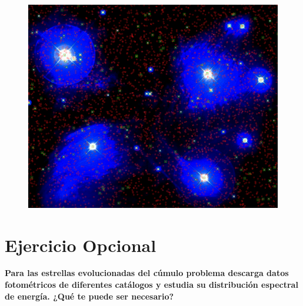 \documentclass[a4paper,fleqn,usenatbib]{mnras}
\begin{document}
\begin{figure}
  \includegraphics[width=\linewidth]{img/m45_cumulo_def}
\end{figure}

\section{Ejercicio Opcional}

\textbf{Para las estrellas evolucionadas del cúmulo problema descarga datos fotométricos de diferentes catálogos y
estudia su distribución espectral de energía. ¿Qué te puede ser necesario?}













\bsp	%
\label{lastpage}
\end{document}
